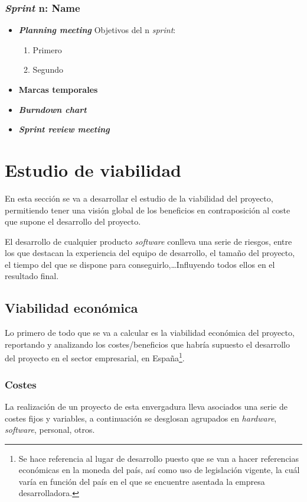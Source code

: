 \subsubsection{\textit{Sprint} n: Name}
\begin{itemize}
\item \textbf{\textit{Planning meeting}}
Objetivos del n \textit{sprint}:
\begin{enumerate}
\item Primero
\item Segundo
\end{enumerate}
\item \textbf{Marcas temporales}

\item \textbf{\textit{Burndown chart}}

\item \textbf{\textit{Sprint review meeting}}

\end{itemize}

\newpage
\section{Estudio de viabilidad}
En esta sección se va a desarrollar el estudio de la viabilidad del proyecto, permitiendo tener una visión global de los beneficios en contraposición al coste que supone el desarrollo del proyecto.

El desarrollo de cualquier producto \textit{software} conlleva una serie de riesgos, entre los que destacan la experiencia del equipo de desarrollo, el tamaño del proyecto, el tiempo del que se dispone para conseguirlo,\dots Influyendo todos ellos en el resultado final.
\subsection{Viabilidad económica}
Lo primero de todo que se va a calcular es la viabilidad económica del proyecto, reportando y analizando los costes/beneficios que habría supuesto el desarrollo del proyecto en el sector empresarial, en España\footnote{Se hace referencia al lugar de desarrollo puesto que se van a hacer referencias económicas en la moneda del país, así como uso de legislación vigente, la cuál varía en función del país en el que se encuentre asentada la empresa desarrolladora.}.

\subsubsection{Costes}
La realización de un proyecto de esta envergadura lleva asociados una serie de costes fijos y variables, a continuación se desglosan agrupados en \textit{hardware}, \textit{software}, personal, otros.

